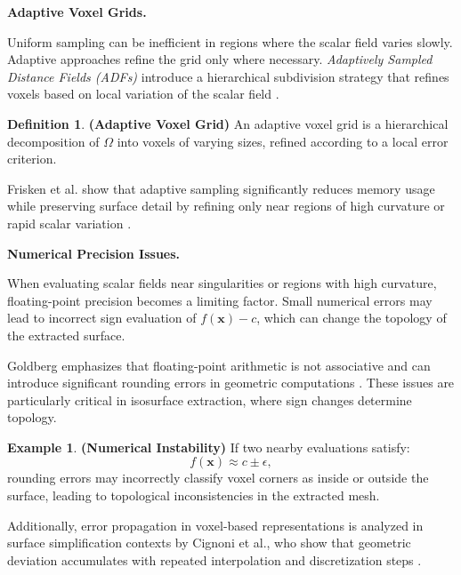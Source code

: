 \documentclass[12pt, a4paper, oneside]{book}
\theoremstyle{plain}
\theoremstyle{definition}
\newtheorem{definition}[theorem]{Definition}
\newtheorem{example}[theorem]{Example}
\theoremstyle{remark}
\theoremstyle{definition}
\begin{document}
\vspace{0.5em}

\textbf{Adaptive Voxel Grids.}

Uniform sampling can be inefficient in regions where the scalar field varies slowly. Adaptive approaches refine the grid only where necessary. \emph{Adaptively Sampled Distance Fields (ADFs)} introduce a hierarchical subdivision strategy that refines voxels based on local variation of the scalar field \cite{frisken2000adaptively}.

\begin{definition}
    \textbf{(Adaptive Voxel Grid)}
An adaptive voxel grid is a hierarchical decomposition of $\Omega$ into voxels of varying sizes, refined according to a local error criterion.
\end{definition}


Frisken et al. show that adaptive sampling significantly reduces memory usage while preserving surface detail by refining only near regions of high curvature or rapid scalar variation \cite{frisken2000adaptively}.

\vspace{0.5em}

\textbf{Numerical Precision Issues.}

When evaluating scalar fields near singularities or regions with high curvature, floating-point precision becomes a limiting factor. Small numerical errors may lead to incorrect sign evaluation of $f(\mathbf{x}) - c$, which can change the topology of the extracted surface.

Goldberg emphasizes that floating-point arithmetic is not associative and can introduce significant rounding errors in geometric computations \cite{goldberg1991every}. These issues are particularly critical in isosurface extraction, where sign changes determine topology.

\begin{example}
    \textbf{(Numerical Instability)}
If two nearby evaluations satisfy:
\[
f(\mathbf{x}) \approx c \pm \epsilon,
\]
rounding errors may incorrectly classify voxel corners as inside or outside the surface, leading to topological inconsistencies in the extracted mesh.
\end{example}


Additionally, error propagation in voxel-based representations is analyzed in surface simplification contexts by Cignoni et al., who show that geometric deviation accumulates with repeated interpolation and discretization steps \cite{cignoni1998metro}.
\end{document}
